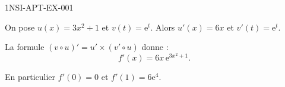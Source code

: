 \begin{corrige}{1NSI-APT-EX-001}


On pose $u(x) = 3x^2 + 1$ et $v(t) = \mathrm{e}^t$. Alors $u'(x) = 6x$ et $v'(t) = \mathrm{e}^t$.

La formule $(v \circ u)' = u' \times (v' \circ u)$ donne :
\[ f'(x) = 6x\, \mathrm{e}^{3x^2 + 1}. \]

En particulier $f'(0) = 0$ et $f'(1) = 6\mathrm{e}^4$.

\end{corrige}
